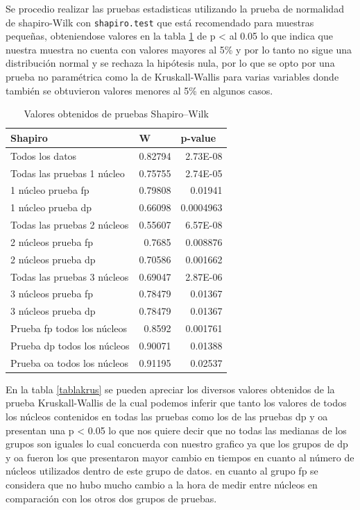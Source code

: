 \documentclass{article}
\begin{document}
Se procedio realizar las pruebas estadisticas utilizando la prueba de normalidad de shapiro-Wilk \cite{shapiro} con \texttt{shapiro.test} que está recomendado para muestras pequeñas, obteniendose valores en la tabla \ref{tablaSha} de p < al 0.05 lo que indica que nuestra muestra no cuenta con valores mayores al 5\% y por lo tanto no sigue una distribución normal y se rechaza la hipótesis nula, por lo que se opto por una prueba no paramétrica como la de Kruskall-Wallis\cite{Kruskall} para varias variables donde también se obtuvieron valores menores al 5\% en algunos casos.

\begin{table}[h!]
\centering
\caption{Valores obtenidos de pruebas Shapiro–Wilk}
\label{tablaSha}
\begin{tabular}{|l|r|r|}
\hline
\textbf{Shapiro} & \multicolumn{1}{l|}{W} & \multicolumn{1}{l|}{p-value} \\ \hline
Todos los datos & 0.82794 & 2.73E-08 \\ \hline
Todas las pruebas 1 núcleo & 0.75755 & 2.74E-05 \\ \hline
1 núcleo prueba fp & 0.79808 & 0.01941 \\ \hline
1 núcleo prueba dp & 0.66098 & 0.0004963 \\ \hline
Todas las pruebas 2 núcleos & 0.55607 & 6.57E-08 \\ \hline
2 núcleos prueba fp & 0.7685 & 0.008876 \\ \hline
2 núcleos prueba dp & 0.70586 & 0.001662 \\ \hline
Todas las pruebas 3 núcleos & 0.69047 & 2.87E-06 \\ \hline
3 núcleos prueba fp & 0.78479 & 0.01367 \\ \hline
3 núcleos prueba dp & 0.78479 & 0.01367 \\ \hline
Prueba fp todos los núcleos & 0.8592 & 0.001761 \\ \hline
Prueba dp todos los núcleos & 0.90071 & 0.01388 \\ \hline
Prueba oa todos los núcleos & 0.91195 & 0.02537 \\ \hline
\end{tabular}
\end{table}
En la tabla \ref{tablakrus} se pueden apreciar los diversos valores obtenidos de la prueba Kruskall-Wallis de la cual podemos inferir que tanto los valores de todos los núcleos contenidos en todas las pruebas como los de las pruebas dp y oa presentan una p < 0.05 lo que nos quiere decir que no todas las medianas de los grupos son iguales lo cual concuerda con nuestro grafico ya que los grupos de dp y oa fueron los que presentaron mayor cambio en tiempos en cuanto al número de núcleos utilizados dentro de este grupo de datos. en cuanto al grupo fp se considera que no hubo mucho cambio a la hora de medir entre núcleos en comparación con los otros dos grupos de pruebas.
\end{document}
